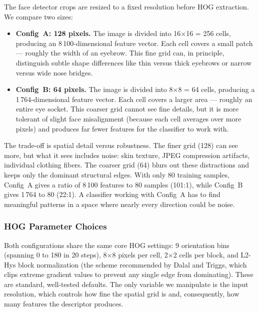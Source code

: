 \documentclass[a4paper,10pt]{article}
\begin{document}
The face detector crops are resized to a fixed resolution before HOG extraction.
We compare two sizes:

\begin{itemize}
    \item \textbf{Config~A: 128 pixels.} The image is divided into 16$\times$16 = 256 cells, producing an 8\,100-dimensional feature vector. Each cell covers a small patch --- roughly the width of an eyebrow. This fine grid can, in principle, distinguish subtle shape differences like thin versus thick eyebrows or narrow versus wide nose bridges.

    \item \textbf{Config~B: 64 pixels.} The image is divided into 8$\times$8 = 64 cells, producing a 1\,764-dimensional feature vector. Each cell covers a larger area --- roughly an entire eye socket. This coarser grid cannot see fine details, but it is more tolerant of slight face misalignment (because each cell averages over more pixels) and produces far fewer features for the classifier to work with.
\end{itemize}

The trade-off is spatial detail versus robustness.
The finer grid (128) can see more, but what it sees includes noise: skin texture, JPEG compression artifacts, individual clothing fibers.
The coarser grid (64) blurs out these distractions and keeps only the dominant structural edges.
With only 80 training samples, Config~A gives a ratio of 8\,100 features to 80 samples (101:1), while Config~B gives 1\,764 to 80 (22:1).
A classifier working with Config~A has to find meaningful patterns in a space where nearly every direction could be noise.

\subsubsection{HOG Parameter Choices}

Both configurations share the same core HOG settings: 9 orientation bins (spanning 0\textdegree{} to 180\textdegree{} in 20\textdegree{} steps), 8$\times$8 pixels per cell, 2$\times$2 cells per block, and L2-Hys block normalization (the scheme recommended by Dalal and Triggs, which clips extreme gradient values to prevent any single edge from dominating).
These are standard, well-tested defaults.
The only variable we manipulate is the input resolution, which controls how fine the spatial grid is and, consequently, how many features the descriptor produces.
\end{document}
